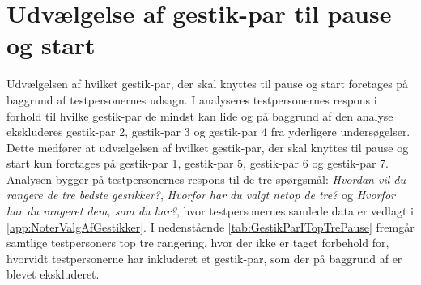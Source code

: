 \section{Udvælgelse af gestik-par til pause og start}
\label{TestresultaterPauseStart}
%
Udvælgelsen af hvilket gestik-par, der skal knyttes til pause og start foretages på baggrund af testpersonernes udsagn. I  analyseres testpersonernes respons i forhold til hvilke gestik-par de mindst kan lide og på baggrund af den analyse ekskluderes gestik-par 2, gestik-par 3 og gestik-par 4 fra yderligere undersøgelser. Dette medfører at udvælgelsen af hvilket gestik-par, der skal knyttes til pause og start kun foretages på gestik-par 1, gestik-par 5, gestik-par 6 og gestik-par 7. Analysen bygger på testpersonernes respons til de tre spørgsmål: \textit{Hvordan vil du rangere de tre bedste gestikker?}, \textit{Hvorfor har du valgt netop de tre?} og \textit{Hvorfor har du rangeret dem, som du har?}, hvor testpersonernes samlede data er vedlagt i \autoref{app:NoterValgAfGestikker}.\blankline
%  
I nedenstående \autoref{tab:GestikParITopTrePause} fremgår samtlige testpersoners top tre rangering, hvor der ikke er taget forbehold for, hvorvidt testpersonerne har inkluderet et gestik-par, som der på baggrund af  er blevet ekskluderet.
%
